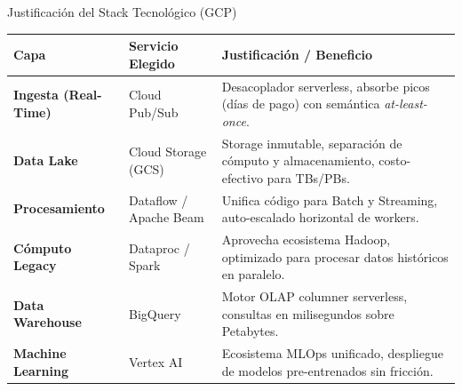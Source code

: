 \documentclass[aspectratio=169, xcolor=table]{beamer}
\begin{document}
\begin{frame}{Justificación del Stack Tecnológico (GCP)}
    \begin{table}[]
        \centering
        \small
        \begin{tabular}{p{3cm} p{3.5cm} p{6cm}}
            \toprule
            \textbf{Capa} & \textbf{Servicio Elegido} & \textbf{Justificación / Beneficio} \\
            \midrule
            \textbf{Ingesta (Real-Time)} & Cloud Pub/Sub & Desacoplador serverless, absorbe picos (días de pago) con semántica \textit{at-least-once}. \\
            \addlinespace
            \textbf{Data Lake} & Cloud Storage (GCS) & Storage inmutable, separación de cómputo y almacenamiento, costo-efectivo para TBs/PBs. \\
            \addlinespace
            \textbf{Procesamiento} & Dataflow / Apache Beam & Unifica código para Batch y Streaming, auto-escalado horizontal de workers. \\
            \addlinespace
            \textbf{Cómputo Legacy} & Dataproc / Spark & Aprovecha ecosistema Hadoop, optimizado para procesar datos históricos en paralelo. \\
            \addlinespace
            \textbf{Data Warehouse} & BigQuery & Motor OLAP columner serverless, consultas en milisegundos sobre Petabytes. \\
            \addlinespace
            \textbf{Machine Learning} & Vertex AI & Ecosistema MLOps unificado, despliegue de modelos pre-entrenados sin fricción. \\
            \bottomrule
        \end{tabular}
    \end{table}
\end{frame}
\end{document}
